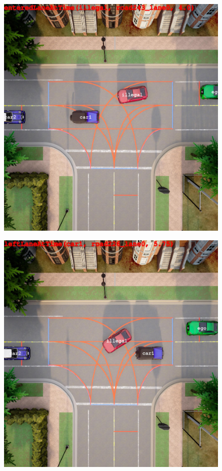 \begin{figure}%
  \centering
  \begin{minipage}[t]{.499\linewidth}
    {\includegraphics[width=\linewidth]{figures/chapter4/T-intersection/1_80.jpg}}%
  \end{minipage}%
  \hfill
  \begin{minipage}[t]{.499\linewidth}
    {\includegraphics[width=\linewidth]{figures/chapter4/T-intersection/1_115.jpg}}%

\end{minipage}
\end{figure}
